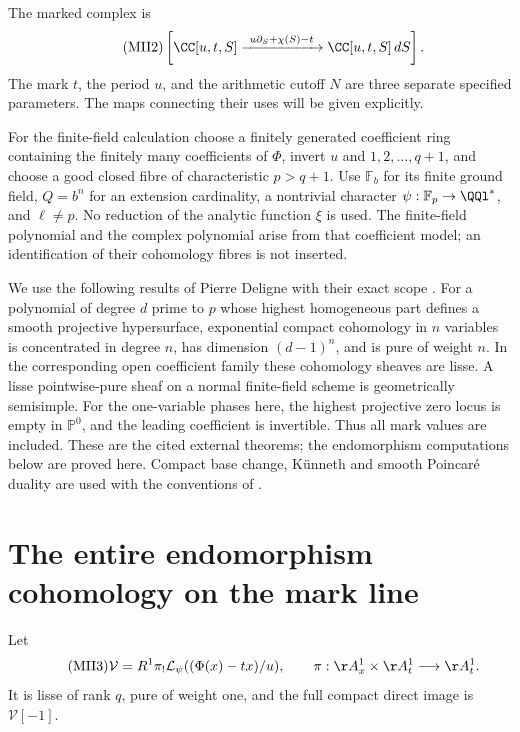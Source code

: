 \documentclass[11pt,a4paper]{article}
\begin{document}
The marked complex is
\begin{equation}\tag{MII2}\label{mii:mii:complex}
 \left[\CC[u,t,S]\xrightarrow{\ u\partial_S+\chi(S)-t\ }
                 \CC[u,t,S]\,dS\right].
\end{equation}
The mark $t$, the period $u$, and the arithmetic cutoff $N$ are three separate
specified parameters. The maps connecting their uses will be given explicitly.

For the finite-field calculation choose a finitely generated coefficient ring
containing the finitely many coefficients of $\Phi$, invert $u$ and
$1,2,\ldots,q+1$, and choose a good closed fibre of characteristic $p>q+1$.
Use $\mathbb F_b$ for its finite ground field, $Q=b^n$ for an extension
cardinality, a nontrivial character $\psi:\mathbb F_p\to\QQl^*$, and $\ell\ne p$.
No reduction of the analytic function $\xi$ is used. The finite-field
polynomial and the complex polynomial arise from that coefficient model; an
identification of their cohomology fibres is not inserted.

We use the following results of Pierre Deligne with their exact scope
\cite[\S3.7, (3.7.2.3), Lemma (3.7.3); (3.4.1)(iii)]{mii:deligne}.
For a polynomial of degree $d$ prime to $p$ whose highest homogeneous part
defines a smooth projective hypersurface, exponential compact cohomology in
$n$ variables is concentrated in degree $n$, has dimension $(d-1)^n$, and is
pure of weight $n$. In the corresponding open coefficient family these
cohomology sheaves are lisse. A lisse pointwise-pure sheaf on a normal
finite-field scheme is geometrically semisimple. For the one-variable phases
here, the highest projective zero locus is empty in $\mathbb P^0$, and the
leading coefficient is invertible. Thus all mark values are included. These
are the cited external theorems; the endomorphism computations below are
proved here. Compact base change, K\"unneth and smooth Poincar\'e duality are
used with the conventions of \cite[\S1.4]{mii:deligne}.

\section{The entire endomorphism cohomology on the mark line}
Let
\begin{equation}\tag{MII3}\label{mii:mii:V}
 \mathcal V=R^1\pi_!\mathcal L_\psi((\Phi(x)-tx)/u),
 \qquad\pi:\AA_x^1\times\AA_t^1\longrightarrow\AA_t^1.
\end{equation}
It is lisse of rank $q$, pure of weight one, and the full compact direct image
is $\mathcal V[-1]$.
\end{document}

